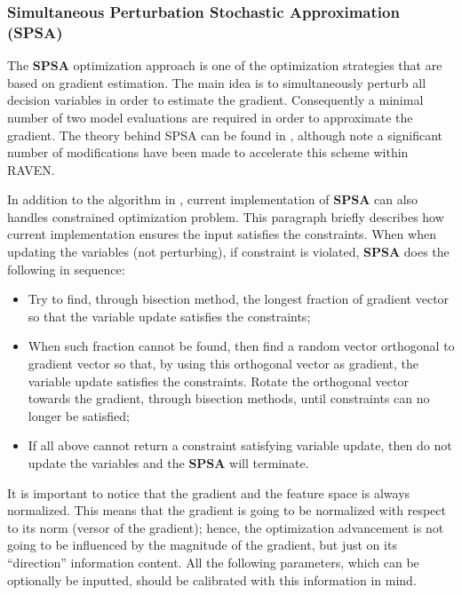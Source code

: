 \subsubsection{Simultaneous Perturbation Stochastic Approximation (SPSA)}
\label{subsubsubsec:SPSA}
The \textbf{SPSA} optimization approach is one of the optimization strategies that are based on gradient estimation. The main
idea is to simultaneously perturb all decision variables in order to estimate the gradient. Consequently a minimal number of two
model evaluations are required in order to approximate the gradient. The theory behind SPSA can be found in
\cite{spall1998implementation}, although note a significant number of modifications have been made to
accelerate this scheme within RAVEN.

In addition to the algorithm in \cite{spall1998implementation}, current implementation of \textbf{SPSA} can also handles
constrained optimization problem. This paragraph briefly describes how current implementation ensures the input satisfies the
constraints. When when updating the variables (not perturbing), if constraint is violated, \textbf{SPSA} does the following in
sequence:
\begin{itemize}
\item Try to find, through bisection method, the longest fraction of gradient vector so that the variable update satisfies the
constraints;
\item When such fraction cannot be found, then find a random vector orthogonal to gradient vector so that, by using this
orthogonal vector as gradient, the variable update satisfies the constraints. Rotate the orthogonal vector towards the gradient,
through bisection methods, until constraints can no longer be satisfied;
\item If all above cannot return a constraint satisfying variable update, then do not update the variables and the \textbf{SPSA} will
terminate.
\end{itemize}

It is important to notice that the gradient and the feature space is always normalized. This means that the gradient is going to be
normalized with respect to its norm (versor of the gradient); hence, the optimization advancement is not going to be influenced by the
magnitude of the gradient, but just on its ``direction'' information content. All the following parameters, which can be optionally be inputted, should be calibrated with this information in mind.
%

